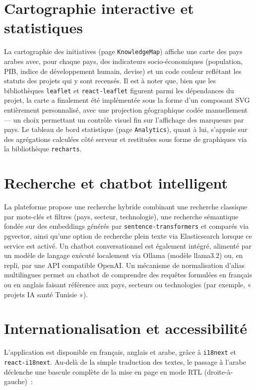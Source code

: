 \documentclass[11pt,a4paper]{report}
\begin{document}
\section{Cartographie interactive et statistiques}

La cartographie des initiatives (page \texttt{KnowledgeMap}) affiche une carte des pays arabes avec, pour
chaque pays, des indicateurs socio-économiques (population, PIB, indice de développement humain, devise) et
un code couleur reflétant les statuts des projets qui y sont recensés. Il est à noter que, bien que les
bibliothèques \texttt{leaflet} et \texttt{react-leaflet} figurent parmi les dépendances du projet, la carte a
finalement été implémentée sous la forme d'un composant SVG entièrement personnalisé, avec une projection
géographique codée manuellement — un choix permettant un contrôle visuel fin sur l'affichage des marqueurs
par pays. Le tableau de bord statistique (page \texttt{Analytics}), quant à lui, s'appuie sur des
agrégations calculées côté serveur et restituées sous forme de graphiques via la bibliothèque
\texttt{recharts}.

\section{Recherche et chatbot intelligent}

La plateforme propose une recherche hybride combinant une recherche classique par mots-clés et filtres
(pays, secteur, technologie), une recherche sémantique fondée sur des embeddings générés par
\texttt{sentence-transformers} et comparés via pgvector, ainsi qu'une option de recherche plein texte via
Elasticsearch lorsque ce service est activé. Un chatbot conversationnel est également intégré, alimenté par
un modèle de langage exécuté localement via Ollama (modèle llama3.2) ou, en repli, par une API compatible
OpenAI. Un mécanisme de normalisation d'alias multilingues permet au chatbot de comprendre des requêtes
formulées en français ou en anglais faisant référence aux pays, secteurs ou technologies (par exemple,
« projets IA santé Tunisie »).

\section{Internationalisation et accessibilité}

L'application est disponible en français, anglais et arabe, grâce à \texttt{i18next} et
\texttt{react-i18next}. Au-delà de la simple traduction des textes, le passage à l'arabe déclenche une
bascule complète de la mise en page en mode RTL (droite-à-gauche)~:
\end{document}
